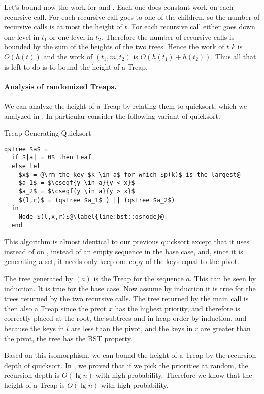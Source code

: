 Let's bound now the work for  and .  
%
Each one does constant work on each recursive call.  
%
For  each recursive call goes to one of the children, so the
number of recursive calls is at most the height of $t$.  
%
For  each recursive call either goes down one level in $t_1$
or one level in $t_2$.  
%
Therefore the number of recursive calls is bounded by the sum of the
heights of the two trees.  
%
Hence the work of  $t$ $k$ is $O(h(t))$ and the work of
$(t_1,m,t_2)$ is $O(h(t_1)+h(t_2))$.  
%
Thus all that is left to do is to bound the height of a Treap.

\paragraph{Analysis of randomized Treaps.}  We can analyze the height
of a Treap by relating them to quicksort, which we analyzed in
.  
%
In particular consider the following variant of
quicksort.
\begin{algorithm}{Treap Generating Quicksort}~
\begin{lstlisting}
qsTree $a$ =
  if $|a| = 0$ then Leaf
  else let
    $x$ = @\rm the key $k \in a$ for which $p(k)$ is the largest@
    $a_1$ = $\cseqf{y \in a}{y < x}$
    $a_2$ = $\cseqf{y \in a}{y > x}$
    $(l,r)$ = (qsTree $a_1$ ) || (qsTree $a_2$)
  in
    Node $(l,x,r)$@\label{line:bst::qsnode}@
  end
\end{lstlisting}
\end{algorithm}
This algorithm is almost identical to our previous quicksort except that it
uses  instead of  on ,
 instead of an empty sequence in the base case, and, since
it is generating a set, it needs only keep one copy of the keys equal
to the pivot.

The tree generated by $(a)$ is the Treap for the sequence
$a$.  
%
This can be seen by induction.  
%
It is true for the base case.
%
Now assume by induction it is true for the trees returned by the two
recursive calls.  
%
The tree returned by the main call is then also a Treap since the
pivot $x$ has the highest priority, and therefore is correctly placed
at the root, the subtrees and in heap order by induction, and because
the keys in $l$ are less than the pivot, and the keys in $r$ are
greater than the pivot, the tree has the BST property.

Based on this isomorphism, we can bound the height of a Treap by the
recursion depth of quicksort.  In , we proved that
if we pick the priorities at random, the recursion depth is
$O(\lg{n})$ with high probability.  Therefore we know that the height
of a Treap is $O(\lg{n})$ with high probability.

